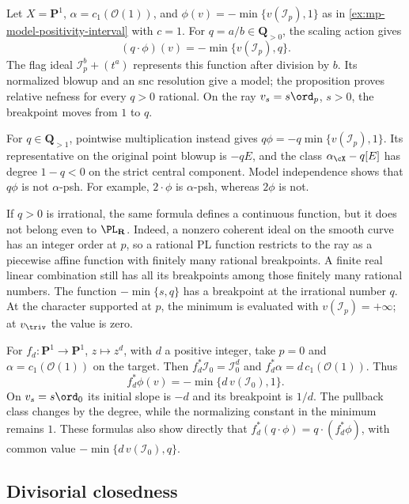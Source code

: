 \begin{example}\label{ex:mp-scaling-breakpoint}
Let $X=\mathbf P^1$, $\alpha=c_1(\mathcal O(1))$, and
$\phi(v)=-\min\{v(\mathcal I_p),1\}$ as in
\cref{ex:mp-model-positivity-interval} with $c=1$.
For $q=a/b\in\mathbf Q_{>0}$, the scaling action gives
\[
                 (q\cdot\phi)(v)=-\min\{v(\mathcal I_p),q\}.
\]
The flag ideal $\mathcal I_p^b+(t^a)$ represents this function
after division by $b$. Its normalized blowup and an snc resolution
give a model; the proposition proves relative nefness for every
$q>0$ rational. On the ray $v_s=s\ord_p$, $s>0$, the breakpoint
moves from $1$ to $q$.

For $q\in\mathbf Q_{>1}$, pointwise multiplication instead gives
$q\phi=-q\min\{v(\mathcal I_p),1\}$. Its representative
on the original point blowup is $-qE$, and the class
$\alpha_{\cX}-q[E]$ has degree $1-q<0$ on the strict central
component. Model independence shows that $q\phi$ is not
$\alpha$-psh. For example, $2\cdot\phi$ is $\alpha$-psh,
whereas $2\phi$ is not.

If $q>0$ is irrational, the same formula defines a continuous
function, but it does not belong even to $\PL_{\mathbf R}$.
Indeed, a nonzero coherent ideal on the smooth curve has an
integer order at $p$, so a rational PL function restricts to the
ray as a piecewise affine function with finitely many rational
breakpoints. A finite real linear combination still has all its
breakpoints among those finitely many rational numbers. The function
$-\min\{s,q\}$ has a breakpoint at the irrational number $q$.
At the character supported at $p$, the minimum is evaluated with
$v(\mathcal I_p)=+\infty$; at $v_{\triv}$ the value is zero.
\end{example}

\begin{example}\label{ex:mp-finite-pullback-curve}
For $f_d:\mathbf P^1\to\mathbf P^1$, $z\mapsto z^d$,
with $d$ a positive integer, take $p=0$ and
$\alpha=c_1(\mathcal O(1))$ on
the target. Then $f_d^*\mathcal I_0=\mathcal I_0^d$ and
$f_d^*\alpha=d\,c_1(\mathcal O(1))$. Thus
\[
      f_d^*\phi(v)=-\min\{d\,v(\mathcal I_0),1\}.
\]
On $v_s=s\ord_0$ its initial slope is $-d$ and its breakpoint
is $1/d$. The pullback class changes by the degree, while the
normalizing constant in the minimum remains $1$.
These formulas also show directly that
$f_d^*(q\cdot\phi)=q\cdot(f_d^*\phi)$, with common value
$-\min\{d\,v(\mathcal I_0),q\}$.
\end{example}

\subsection{Divisorial closedness}
\label{subsec:mp-psh-closedness}

